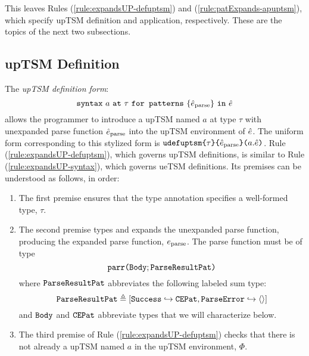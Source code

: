 {{{{This leaves Rules (\ref{rule:expandsUP-defuptsm}) and (\ref{rule:patExpands-apuptsm}), which specify upTSM definition and application, respectively. These are the topics of the next two subsections.
\subsection{upTSM Definition}
The \emph{upTSM definition form}:
\[\texttt{syntax}~a~\texttt{at}~\tau~\texttt{for~patterns}~\{\hat{e}_\text{parse}\}~\texttt{in}~\hat{e}\]
allows the programmer to introduce a upTSM named $a$ at type $\tau$ with unexpanded parse function $\hat{e}_\text{parse}$ into the upTSM environment of $\hat{e}$. The uniform form corresponding to this stylized form is $\texttt{udefuptsm}\texttt{\{}\tau\texttt{\}\{}\hat{e}_\text{parse}\texttt{\}(}a.\hat{e}\texttt{)}$. Rule (\ref{rule:expandsUP-defuptsm}), which governs upTSM definitions, is similar to Rule (\ref{rule:expandsUP-syntax}), which governs ueTSM definitions. Its premises can be understood as follows, in order:
\begin{enumerate}
\item The first premise ensures that the type annotation specifies a well-formed type, $\tau$.
\item The second premise types and expands the unexpanded parse function, producing the expanded parse function, $e_\text{parse}$. The parse function must be of type
\[\texttt{parr}\texttt{(}\mathtt{Body}; \mathtt{ParseResultPat}\texttt{)}\]
where $\mathtt{ParseResultPat}$ abbreviates the following labeled sum type:\[\mathtt{ParseResultPat} \triangleq [\mathtt{Success} \hookrightarrow \mathtt{CEPat}, \mathtt{ParseError} \hookrightarrow \langle  \rangle]\]
and $\mathtt{Body}$ and $\mathtt{CEPat}$ abbreviate types that we will characterize below.
\item The third premise of Rule (\ref{rule:expandsUP-defuptsm}) checks that there is not already a upTSM named $a$ in the upTSM environment, $\Phi$.


\end{enumerate}}}}}
